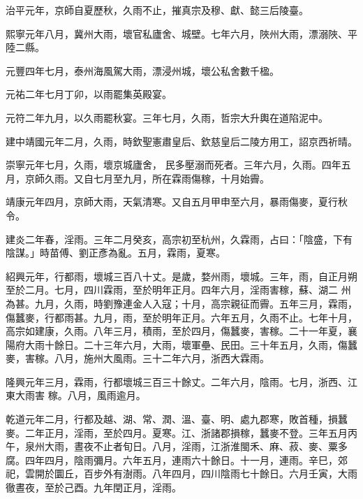 \begin{pinyinscope}
 治平元年，京師自夏歷秋，久雨不止，摧真宗及穆、獻、懿三后陵臺。



 熙寧元年八月，冀州大雨，壞官私廬舍、城壁。七年六月，陜州大雨，漂溺陜、平陸二縣。



 元豐四年七月，泰州海風駕大雨，漂浸州城，壞公私舍數千楹。



 元祐二年七月丁卯，以雨罷集英殿宴。



 元符二年九月，以久雨罷秋宴。三年七月，久雨，哲宗大升輿在道陷泥中。



 建中靖國元年二月，久雨，時欽聖憲肅皇后、欽慈皇后二陵方用工，詔京西祈晴。



 崇寧元年七月，久雨，壞京城廬舍，
 民多壓溺而死者。三年六月，久雨。四年五月，京師久雨。又自七月至九月，所在霖雨傷稼，十月始霽。



 靖康元年四月，京師大雨，天氣清寒。又自五月甲申至六月，暴雨傷麥，夏行秋令。



 建炎二年春，淫雨。三年二月癸亥，高宗初至杭州，久霖雨，占曰：「陰盛，下有陰謀。」時苗傅、劉正彥為亂。五月，霖雨，夏寒。



 紹興元年，行都雨，壞城三百八十丈。是歲，婺州雨，壞城。三年，雨，自正月朔至於二月。七月，四川霖雨，至於明年正月。四年六月，淫雨害稼，蘇、湖二
 州為甚。九月，久雨，時劉豫連金人入寇；十月，高宗親征而霽。五年三月，霖雨，傷蠶麥，行都雨甚。九月，雨，至於明年正月。六年五月，久雨不止。七年十月，高宗如建康，久雨。八年三月，積雨，至於四月，傷蠶麥，害稼。二十一年夏，襄陽府大雨十餘日。二十三年六月，大雨，壞軍壘、民田。三十年五月，久雨，傷蠶麥，害稼。八月，施州大風雨。三十二年六月，浙西大霖雨。



 隆興元年三月，霖雨，行都壞城三百三十餘丈。二年六月，陰雨。七月，浙西、江東大雨害
 稼。八月，風雨逾月。



 乾道元年二月，行都及越、湖、常、潤、溫、臺、明、處九郡寒，敗首種，損蠶麥。二年正月，淫雨，至於四月。夏寒。江、浙諸郡損稼，蠶麥不登。三年五月丙午，泉州大雨，晝夜不止者旬日。八月，淫雨，江浙淮閩禾、麻、菽、麥、粟多腐。四年四月，陰雨彌月。六年五月，連雨六十餘日。十一月，連雨。辛巳，郊祀，雲開於圜丘，百步外有澍雨。八年四月，四川陰雨七十餘日。六月壬寅，大雨徹晝夜，至於己酉。九年閏正月，淫雨。




\end{pinyinscope}
